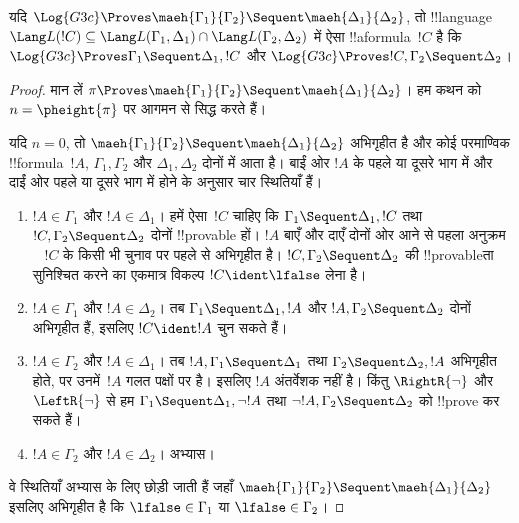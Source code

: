 \documentclass[../../../include/open-logic-section]{subfiles}
\begin{document}
\begin{lem}[माएहारा प्रमेय] यदि $\Log{G3c} \Proves
\maeh{\Gamma_1}{\Gamma_2} \Sequent \maeh{\Delta_1}{\Delta_2}$, तो
!!{language}~$\Lang L(!C) \subseteq \Lang L(\Gamma_1, \Delta_1) \cap \Lang
L(\Gamma_2, \Delta_2)$ में ऐसा !!a{formula}~$!C$ है कि $\Log{G3c} \Proves
\Gamma_1 \Sequent \Delta_1, !C$ और $\Log{G3c} \Proves !C, \Gamma_2 \Sequent
\Delta_2$।
\end{lem}

\begin{proof}
  मान लें $\pi \Proves \maeh{\Gamma_1}{\Gamma_2} \Sequent
  \maeh{\Delta_1}{\Delta_2}$। हम कथन को $n=\pheight{\pi}$ पर आगमन से सिद्ध
  करते हैं।

  यदि $n=0$, तो $\maeh{\Gamma_1}{\Gamma_2} \Sequent
  \maeh{\Delta_1}{\Delta_2}$ अभिगृहीत है और कोई परमाण्विक !!{formula}~$!A$,
  $\Gamma_1, \Gamma_2$ और $\Delta_1, \Delta_2$ दोनों में आता है। बाईं ओर
  $!A$ के पहले या दूसरे भाग में और दाईं ओर पहले या दूसरे भाग में होने के
  अनुसार चार स्थितियाँ हैं।
  \begin{enumerate}
    \item $!A \in \Gamma_1$ और $!A \in \Delta_1$। हमें ऐसा~$!C$ चाहिए कि
    $\Gamma_1 \Sequent \Delta_1, !C$ तथा $!C, \Gamma_2 \Sequent \Delta_2$
    दोनों !!{provable} हों। $!A$ बाएँ और दाएँ दोनों ओर आने से पहला अनुक्रम
    ~ $!C$ के किसी भी चुनाव पर पहले से अभिगृहीत है। $!C, \Gamma_2 \Sequent
    \Delta_2$ की !!{provable}ता सुनिश्चित करने का एकमात्र विकल्प $!C \ident
    \lfalse$ लेना है।
    \item $!A \in \Gamma_1$ और $!A \in \Delta_2$। तब $\Gamma_1 \Sequent
    \Delta_1, !A$ और $!A, \Gamma_2 \Sequent \Delta_2$ दोनों अभिगृहीत हैं,
    इसलिए $!C \ident !A$ चुन सकते हैं।
    \item $!A \in \Gamma_2$ और $!A \in \Delta_1$। तब $!A, \Gamma_1
    \Sequent \Delta_1$ तथा $\Gamma_2 \Sequent \Delta_2, !A$ अभिगृहीत होते,
    पर उनमें~$!A$ गलत पक्षों पर है। इसलिए $!A$ अंतर्वेशक नहीं है। किंतु
    $\RightR{\lnot}$ और $\LeftR{\lnot}$ से हम $\Gamma_1 \Sequent \Delta_1,
    \lnot!A$ तथा $\lnot !A, \Gamma_2 \Sequent \Delta_2$ को !!{prove} कर सकते
    हैं।
    \item $!A \in \Gamma_2$ और $!A \in \Delta_2$। अभ्यास।
  \end{enumerate}
  वे स्थितियाँ अभ्यास के लिए छोड़ी जाती हैं जहाँ
  $\maeh{\Gamma_1}{\Gamma_2} \Sequent \maeh{\Delta_1}{\Delta_2}$ इसलिए
  अभिगृहीत है कि $\lfalse \in \Gamma_1$ या $\lfalse \in \Gamma_2$।


\end{proof}
\end{document}
